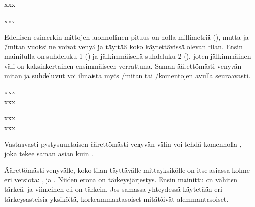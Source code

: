 \pagebreak[3]

\begin{koodilohkosis}
  x\hspace{0mm plus 1fill}x\hspace{0mm plus 2fill}x
\end{koodilohkosis}

\begin{tulossis}
  x\hspace{0mm plus 1fill}x\hspace{0mm plus 2fill}x
\end{tulossis}

Edellisen esimerkin mittojen luonnollinen pituus on nolla millimetriä
(\koodi{0mm}), mutta  ja  \=/mitan vuoksi ne
voivat venyä ja täyttää koko käytettävissä olevan tilan. Ensin
mainitulla on suhdeluku 1 () ja jälkimmäisellä suhdeluku 2
(), joten jälkimmäinen väli on kaksinkertainen ensimmäiseen
verrattuna. Saman äärettömästi venyvän mitan ja suhdeluvut voi ilmaista
myös \-/mitan tai \-/komentojen
avulla seuraavasti.

\pagebreak[3]

\begin{koodilohkosis}
  xxx \\
  x\hfill x\hfill\hfill x
\end{koodilohkosis}

\begin{tulossis}
  xxx \\
  x\hfill x\hfill\hfill x
\end{tulossis}

Vastaavasti pystysuuntaisen äärettömästi venyvän välin voi tehdä
komennolla , joka tekee saman asian kuin .

Äärettömästi venyvälle, koko tilan täyttävälle mittayksikölle on itse
asiassa kolme eri versiota: ,  ja .
Niiden erona on tärkeysjärjestys. Ensin mainittu  on vähiten
tärkeä, ja viimeinen eli  on tärkein. Jos samassa
yhteydessä käytetään eri tär\-keys\-as\-tei\-sia yksiköitä,
korkeammantasoiset mitätöivät alemmantasoiset.

\pagebreak[3]


